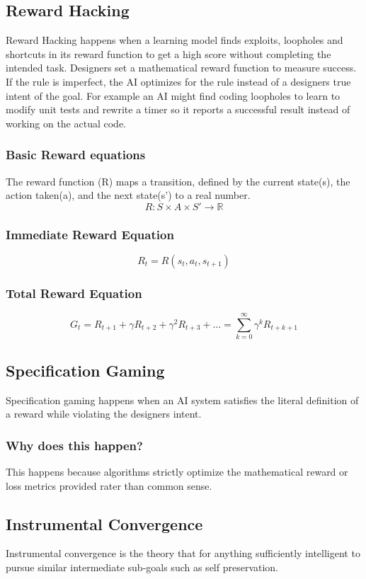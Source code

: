 \documentclass{report}
\begin{document}
	\subsection{Reward Hacking}
	Reward Hacking happens when a learning model finds exploits, loopholes and shortcuts in its reward function to get a high score without completing the intended task. Designers set a mathematical reward function to measure success. If the rule is imperfect, the AI optimizes for the rule instead of a designers true intent of the goal. For example an AI might find coding loopholes to learn to modify unit tests and rewrite a timer so it reports a successful result instead of working on the actual code.
	
	\subsubsection{Basic Reward equations}
	The reward function (R) maps a transition, defined by the current state(s), the action taken(a), and the next state(s') to a real number.
	\[ R: S \times A \times S' \rightarrow \mathbb{R} \]
	
	\subsubsection{Immediate Reward Equation}
	\[ R_t = R(s_t, a_t, s_{t+1}) \]
	
	\subsubsection{Total Reward Equation}
	\[ G_t = R_{t+1} + \gamma R_{t+2} + \gamma^2 R_{t+3} + \dots = \sum_{k=0}^{\infty} \gamma^k R_{t+k+1} \]
	
	\subsection{Specification Gaming}
	Specification gaming happens when an AI system satisfies the literal definition of a reward while violating the designers intent.
	
	\subsubsection{Why does this happen?}
	This happens because algorithms strictly optimize the mathematical reward or loss metrics provided rater than common sense. 
	
	\subsection{Instrumental Convergence}
	Instrumental convergence is the theory that for anything sufficiently intelligent to pursue similar intermediate sub-goals such as self preservation.
	
\end{document}
